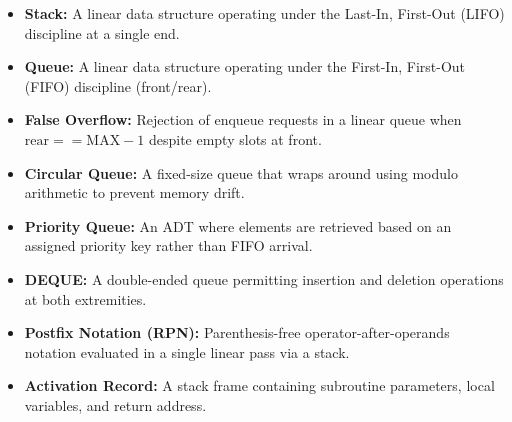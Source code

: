\documentclass[12pt,a4paper]{article}
\begin{document}
\begin{tcolorbox}[defbox, title={\textbf{One-Line Definitions}}]
\begin{itemize}[leftmargin=*, itemsep=2pt, topsep=0pt]
  \item \textbf{Stack:} A linear data structure operating under the Last-In, First-Out (LIFO) discipline at a single end.
  \item \textbf{Queue:} A linear data structure operating under the First-In, First-Out (FIFO) discipline (front/rear).
  \item \textbf{False Overflow:} Rejection of enqueue requests in a linear queue when $\text{rear} == \text{MAX}-1$ despite empty slots at front.
  \item \textbf{Circular Queue:} A fixed-size queue that wraps around using modulo arithmetic to prevent memory drift.
  \item \textbf{Priority Queue:} An ADT where elements are retrieved based on an assigned priority key rather than FIFO arrival.
  \item \textbf{DEQUE:} A double-ended queue permitting insertion and deletion operations at both extremities.
  \item \textbf{Postfix Notation (RPN):} Parenthesis-free operator-after-operands notation evaluated in a single linear pass via a stack.
  \item \textbf{Activation Record:} A stack frame containing subroutine parameters, local variables, and return address.
\end{itemize}
\end{tcolorbox}

\newpage
\end{document}
